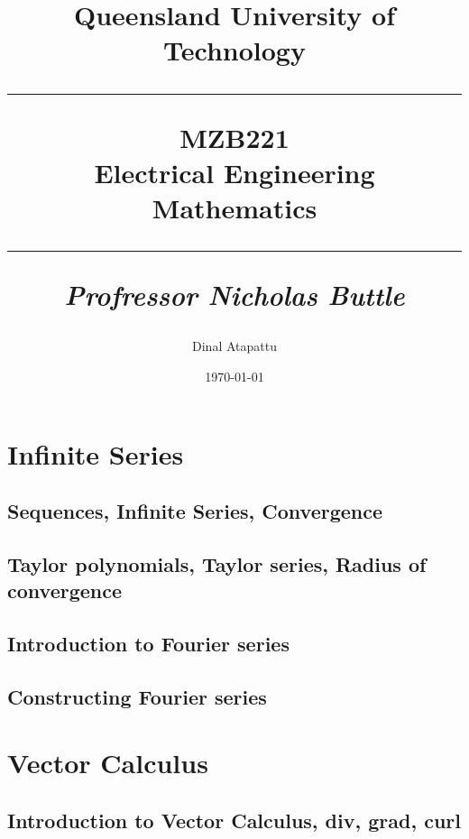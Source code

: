 \documentclass{book}
\begin{document}
    \title{
            Queensland University of Technology\\
            \rule{\linewidth}{0.5pt}
        \centering
        \textbf{MZB221} \\
        Electrical Engineering Mathematics\\
        \vspace{0.4cm}
        \rule{\linewidth}{1.5pt}
        \small{\textit{Profressor Nicholas Buttle}}
    }
    \author{Dinal Atapattu}
    \date{\today}
    \maketitle
    \thispagestyle{empty}
    \tableofcontents
    \chapter{Infinite Series}
        \section{Sequences, Infinite Series, Convergence}
        \section{Taylor polynomials, Taylor series, Radius of convergence}
        \section{Introduction to Fourier series}
        \section{Constructing Fourier series}
    \chapter{Vector Calculus}
        \section{Introduction to Vector Calculus, div, grad, curl}
\end{document}

